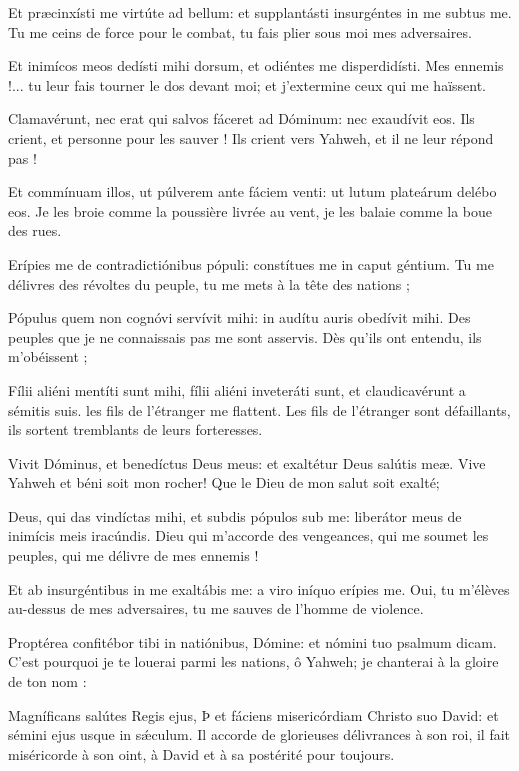 \begin{paracol}{2}

\LigneParacol{0cm}
{Et præcinxísti me virtúte ad bellum: \GreStar{} et supplantásti insurgéntes in me subtus me.}
{Tu me ceins de force pour le combat, tu fais plier sous moi mes adversaires. }

\LigneParacol{0.2cm}
{Et inimícos meos dedísti mihi dorsum, \GreStar{} et odiéntes me disperdidísti.}
{Mes ennemis !... tu leur fais tourner le dos devant moi; et j'extermine ceux qui me haïssent. }

\LigneParacol{0.2cm}
{Clamavérunt, nec erat qui salvos fáceret ad Dóminum: \GreStar{} nec exaudívit eos.}
{Ils crient, et personne pour les sauver ! Ils crient vers Yahweh, et il ne leur répond pas ! }

\LigneParacol{0.2cm}
{Et commínuam illos, ut púlverem ante fáciem venti: \GreStar{} ut lutum plateárum delébo eos.}
{Je les broie comme la poussière livrée au vent, je les balaie comme la boue des rues. }

\LigneParacol{0.2cm}
{Erípies me de contradictiónibus pópuli: \GreStar{} constítues me in caput géntium.}
{Tu me délivres des révoltes du peuple, tu me mets à la tête des nations ;}

\LigneParacol{0.2cm}
{Pópulus quem non cognóvi servívit mihi: \GreStar{} in audítu auris obedívit mihi.}
{Des peuples que je ne connaissais pas me sont asservis. Dès qu'ils ont entendu, ils m'obéissent ;}

\LigneParacol{0.2cm}
{Fílii aliéni mentíti sunt mihi, \GreStar{} fílii aliéni inveteráti sunt, et claudicavérunt a sémitis suis.}
{les fils de l'étranger me flattent. Les fils de l'étranger sont défaillants, ils sortent tremblants de leurs forteresses. }

\end{paracol}
\Gloria
\begin{paracol}{2}

\LigneParacol{0cm}
{Vivit Dóminus, et benedíctus Deus meus: \GreStar{} et exaltétur Deus salútis meæ.}
{Vive Yahweh et béni soit mon rocher! Que le Dieu de mon salut soit exalté; }

\LigneParacol{0.2cm}
{Deus, qui das vindíctas mihi, et subdis pópulos sub me: \GreStar{} liberátor meus de inimícis meis iracúndis.}
{Dieu qui m'accorde des vengeances, qui me soumet les peuples, qui me délivre de mes ennemis !}

\LigneParacol{0.2cm}
{Et ab insurgéntibus in me exaltábis me: \GreStar{} a viro iníquo erípies me.}
{Oui, tu m'élèves au-dessus de mes adversaires, tu me sauves de l'homme de violence. }

\LigneParacol{0.2cm}
{Proptérea confitébor tibi in natiónibus, Dómine: \GreStar{} et nómini tuo psalmum dicam.}
{C'est pourquoi je te louerai parmi les nations, ô Yahweh; je chanterai à la gloire de ton nom :}

\LigneParacol{0.2cm}
{Magníficans salútes Regis ejus, Þ et fáciens misericórdiam Christo suo David: \GreStar{} et sémini ejus usque in sǽculum.}
{Il accorde de glorieuses délivrances à son roi, il fait miséricorde à son oint, à David et à sa postérité pour toujours. }

\end{paracol}
